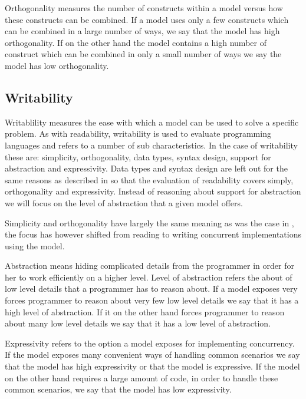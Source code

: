 Orthogonality measures the number of constructs within a model versus how these constructs can be combined\cite[p. 9]{sebestaProLang}. If a model uses only a few constructs which can be combined in a large number of ways, we say that the model has high orthogonality. If on the other hand the model contains a high number of construct which can be combined in only a small number of ways we say the model has low orthogonality.

\subsection{Writability}\label{sec:writablity}
Writablility measures the ease with which a model can be used to solve a specific problem\cite[p. 13]{sebestaProLang}. As with readability, writability is used to evaluate programming languages and refers to a number of sub characteristics. In the case of writability these are: simplicity, orthogonality, data types, syntax design, support for abstraction and expressivity. Data types and syntax design are left out for the same reasons as described in  so that the evaluation of readability  covers simply, orthogonality and expressivity. Instead of reasoning about support for abstraction we will focus on the level of abstraction that a given model offers.

Simplicity and orthogonality have largely the same meaning as was the case in , the focus has however shifted from reading to writing concurrent implementations using the model. 

Abstraction means hiding complicated details from the programmer in order for her to work efficiently on a higher level\cite[p. 14]{sebestaProLang}. Level of abstraction refers the about of low level details that a programmer has to reason about. If a model exposes very forces programmer to reason about very few low level details we say that it has a high level of abstraction. If it on the other hand forces programmer to reason about many low level details we say that it has a low level of abstraction.

Expressivity refers to the option a model exposes for implementing concurrency. If the model exposes many convenient ways of handling common scenarios we say that the model has high expressivity or that the model is expressive. If the model on the other hand requires a large amount of code, in order to handle these common scenarios, we say that the model has low expressivity.

